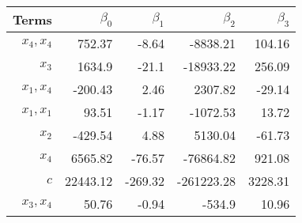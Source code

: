 \begin{tabular}{rrrrr}
Terms & $\beta_0$ & $\beta_1$ & $\beta_2$ & $\beta_3$ \\ 
\hline 
$x_4,x_4$ & 752.37 & -8.64 & -8838.21 & 104.16 \\ 
$x_3$ & 1634.9 & -21.1 & -18933.22 & 256.09 \\ 
$x_1,x_4$ & -200.43 & 2.46 & 2307.82 & -29.14 \\ 
$x_1,x_1$ & 93.51 & -1.17 & -1072.53 & 13.72 \\ 
$x_2$ & -429.54 & 4.88 & 5130.04 & -61.73 \\ 
$x_4$ & 6565.82 & -76.57 & -76864.82 & 921.08 \\ 
$c$ & 22443.12 & -269.32 & -261223.28 & 3228.31 \\ 
$x_3,x_4$ & 50.76 & -0.94 & -534.9 & 10.96 \\ 
\hline 
\end{tabular}